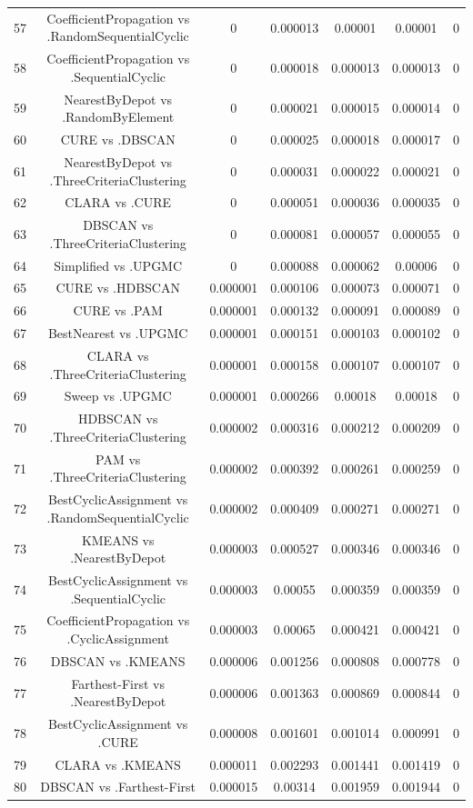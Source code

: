 \documentclass[a4paper,10pt]{article}
\begin{document}
\begin{landscape}
\begin{table}[!htp]
\begin{tabular}{ccccccc}
57&CoefficientPropagation vs .RandomSequentialCyclic&0&0.000013&0.00001&0.00001&0\\
58&CoefficientPropagation vs .SequentialCyclic&0&0.000018&0.000013&0.000013&0\\
59&NearestByDepot vs .RandomByElement&0&0.000021&0.000015&0.000014&0\\
60&CURE vs .DBSCAN&0&0.000025&0.000018&0.000017&0\\
61&NearestByDepot vs .ThreeCriteriaClustering&0&0.000031&0.000022&0.000021&0\\
62&CLARA vs .CURE&0&0.000051&0.000036&0.000035&0\\
63&DBSCAN vs .ThreeCriteriaClustering&0&0.000081&0.000057&0.000055&0\\
64&Simplified vs .UPGMC&0&0.000088&0.000062&0.00006&0\\
65&CURE vs .HDBSCAN&0.000001&0.000106&0.000073&0.000071&0\\
66&CURE vs .PAM&0.000001&0.000132&0.000091&0.000089&0\\
67&BestNearest vs .UPGMC&0.000001&0.000151&0.000103&0.000102&0\\
68&CLARA vs .ThreeCriteriaClustering&0.000001&0.000158&0.000107&0.000107&0\\
69&Sweep vs .UPGMC&0.000001&0.000266&0.00018&0.00018&0\\
70&HDBSCAN vs .ThreeCriteriaClustering&0.000002&0.000316&0.000212&0.000209&0\\
71&PAM vs .ThreeCriteriaClustering&0.000002&0.000392&0.000261&0.000259&0\\
72&BestCyclicAssignment vs .RandomSequentialCyclic&0.000002&0.000409&0.000271&0.000271&0\\
73&KMEANS vs .NearestByDepot&0.000003&0.000527&0.000346&0.000346&0\\
74&BestCyclicAssignment vs .SequentialCyclic&0.000003&0.00055&0.000359&0.000359&0\\
75&CoefficientPropagation vs .CyclicAssignment&0.000003&0.00065&0.000421&0.000421&0\\
76&DBSCAN vs .KMEANS&0.000006&0.001256&0.000808&0.000778&0\\
77&Farthest-First vs .NearestByDepot&0.000006&0.001363&0.000869&0.000844&0\\
78&BestCyclicAssignment vs .CURE&0.000008&0.001601&0.001014&0.000991&0\\
79&CLARA vs .KMEANS&0.000011&0.002293&0.001441&0.001419&0\\
80&DBSCAN vs .Farthest-First&0.000015&0.00314&0.001959&0.001944&0\\

\end{tabular}
\end{table}
\end{landscape}
\end{document}
